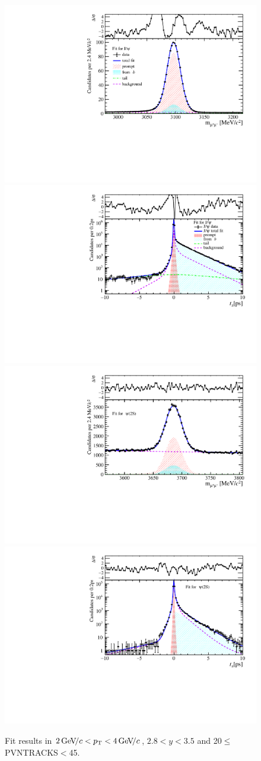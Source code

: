 \begin{figure}[H]
\begin{center}
\includegraphics[width=0.47\linewidth]{pdf/Jpsi/drawmass/n2y2pt2.pdf}
\includegraphics[width=0.47\linewidth]{pdf/Jpsi/2DFit/n2y2pt2.pdf}
\vspace*{-0.5cm}
\includegraphics[width=0.47\linewidth]{pdf/Psi2S/drawmass/n2y2pt2.pdf}
\includegraphics[width=0.47\linewidth]{pdf/Psi2S/2DFit/n2y2pt2.pdf}
\vspace*{-0.5cm}
\end{center}
\caption{Fit results in $2\text{\,Ge\kern -0.1em V\!/}c<p_{\mathrm{T}}<4\text{\,Ge\kern -0.1em V\!/}c$, $2.8<y<3.5$ and 20$\leq$PVNTRACKS$<$45.}
\label{Fitn2y2pt2}
\end{figure}
